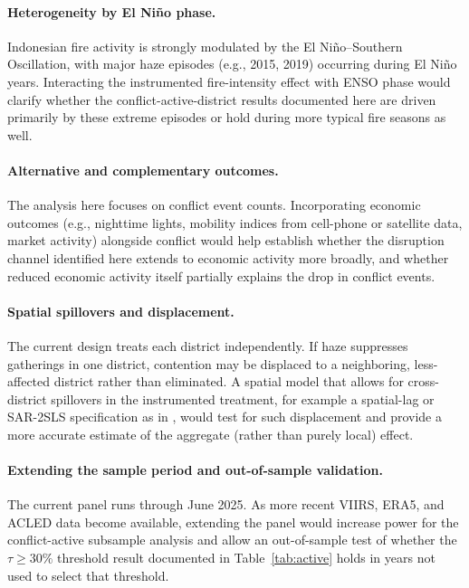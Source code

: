 \documentclass[12pt]{article}
\begin{document}
\paragraph{Heterogeneity by El Ni\~{n}o phase.} Indonesian fire activity is strongly modulated by the El Ni\~{n}o--Southern Oscillation, with major haze episodes (e.g., 2015, 2019) occurring during El Ni\~{n}o years. Interacting the instrumented fire-intensity effect with ENSO phase would clarify whether the conflict-active-district results documented here are driven primarily by these extreme episodes or hold during more typical fire seasons as well.

\paragraph{Alternative and complementary outcomes.} The analysis here focuses on conflict event counts. Incorporating economic outcomes (e.g., nighttime lights, mobility indices from cell-phone or satellite data, market activity) alongside conflict would help establish whether the disruption channel identified here extends to economic activity more broadly, and whether reduced economic activity itself partially explains the drop in conflict events.

\paragraph{Spatial spillovers and displacement.} The current design treats each district independently. If haze suppresses gatherings in one district, contention may be displaced to a neighboring, less-affected district rather than eliminated. A spatial model that allows for cross-district spillovers in the instrumented treatment, for example a spatial-lag or SAR-2SLS specification as in \citet{lu2023fish}, would test for such displacement and provide a more accurate estimate of the aggregate (rather than purely local) effect.

\paragraph{Extending the sample period and out-of-sample validation.} The current panel runs through June 2025. As more recent VIIRS, ERA5, and ACLED data become available, extending the panel would increase power for the conflict-active subsample analysis and allow an out-of-sample test of whether the $\tau \geq 30\%$ threshold result documented in Table~\ref{tab:active} holds in years not used to select that threshold.
\end{document}
